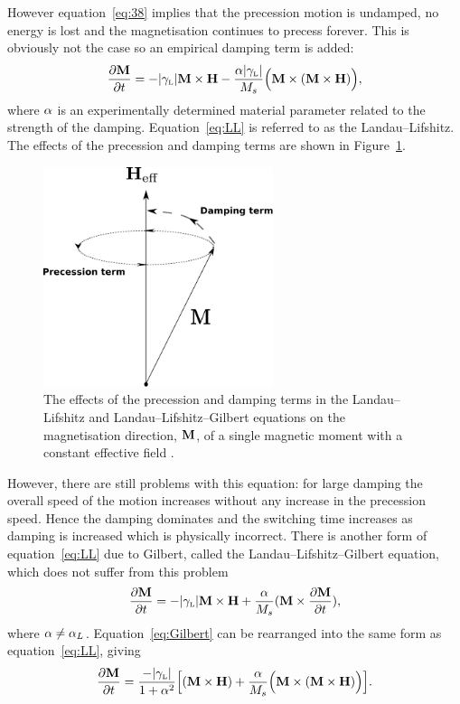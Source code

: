 However equation~\eqref{eq:38} implies that the precession motion is undamped, \ie no energy is lost and the magnetisation continues to precess forever. This is obviously not the case so an empirical damping term is added:
\begin{equation}
  \label{eq:LL}
  \frac{\partial \mathbf{M}}{\partial t} = - {\left|{\gamma_{\text{\tiny{L}}}} \right|} \mathbf{M} \times \mathbf{H} - \frac{\alpha {\left|{\gamma_{\text{\tiny{L}}}} \right|}}{M_s} \Big( \mathbf{M} \times (\mathbf{M} \times \mathbf{H}) \Big),
\end{equation}
where $\alpha$ is an experimentally determined material parameter related to the strength of the damping. Equation~\eqref{eq:LL} is referred to as the Landau--Lifshitz.\cite{Landau1935} The effects of the precession and damping terms are shown in Figure~\ref{fig:LLG-terms}.

\begin{figure}[ht!]
  \centering
  \includegraphics[width=0.6\textwidth]{./images/LLG-terms}
  \caption{The effects of the precession and damping terms in the Landau--Lifshitz and Landau--Lifshitz--Gilbert equations on the magnetisation direction, $\mathbf{M}$, of a single magnetic moment with a constant effective field
.}
  \label{fig:LLG-terms}
\end{figure}

However, there are still problems with this equation: for large damping the overall speed of the
motion increases without any increase in the precession speed. Hence the damping dominates and the switching time increases as damping is increased which is physically incorrect.\cite{Mallinson1987} There is another form of equation~\eqref{eq:LL} due to Gilbert\cite{Gilbert2004}, called the Landau--Lifshitz--Gilbert equation, which does not suffer from this problem
\begin{equation}
  \label{eq:Gilbert}
  \frac{\partial \mathbf{M}}{\partial t} = - {\left|{\gamma_{\text{\tiny{L}}}} \right|} \mathbf{M} \times \mathbf{H} + \frac{\alpha}{M_s} (\mathbf{M} \times \frac{\partial \mathbf{M}}{\partial t}),
\end{equation}
where $\alpha \neq \alpha_L$. Equation~\eqref{eq:Gilbert} can be rearranged into the same form as equation~\eqref{eq:LL}, giving
\begin{equation}
  \label{eq:LLG}
  \frac{\partial \mathbf{M}}{\partial t} = \frac{-{\left|{\gamma_{\text{\tiny{L}}}} \right|}}{1 + \alpha^2} \Big[ (\mathbf{M} \times \mathbf{H}) + \frac{\alpha}{M_s} \Big(\mathbf{M} \times (\mathbf{M} \times \mathbf{H}) \Big) \Big].
\end{equation}

